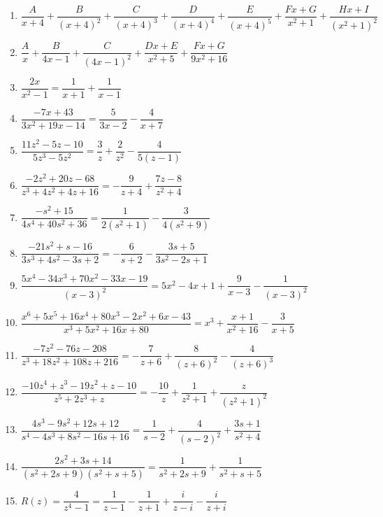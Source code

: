 \documentclass{ximera}
\begin{document}
\begin{enumerate}
\setcounter{enumi}{\value{HW}}

\item $\dfrac{A}{x + 4} + \dfrac{B}{(x + 4)^{2}} + \dfrac{C}{(x + 4)^{3}} + \dfrac{D}{(x + 4)^{4}} + \dfrac{E}{(x + 4)^{5}} + \dfrac{Fx + G}{x^{2} + 1} + \dfrac{Hx + I}{(x^{2} + 1)^{2}}$
\item $\dfrac{A}{x} + \dfrac{B}{4x - 1} + \dfrac{C}{(4x - 1)^{2}} + \dfrac{Dx + E}{x^{2} + 5} + \dfrac{Fx + G}{9x^{2} + 16}$


\item $\dfrac{2x}{x^{2} - 1} = \dfrac{1}{x + 1} + \dfrac{1}{x - 1}$
\item $\dfrac{-7x + 43}{3x^{2} + 19x - 14}= \dfrac{5}{3x - 2} - \dfrac{4}{x + 7}$


\item $\dfrac{11z^{2} - 5z - 10}{5z^{3} - 5z^{2}} = \dfrac{3}{z} + \dfrac{2}{z^{2}} - \dfrac{4}{5(z - 1)}$
\item $\dfrac{-2z^{2} + 20z - 68}{z^{3} + 4z^{2} + 4z + 16} = -\dfrac{9}{z + 4} + \dfrac{7z - 8}{z^{2} + 4}$


\item $\dfrac{-s^{2} + 15}{4s^{4} + 40s^{2} + 36} = \dfrac{1}{2(s^{2} + 1)} - \dfrac{3}{4(s^{2} + 9)}$
\item $\dfrac{-21s^{2} + s - 16}{3s^{3} + 4s^{2} - 3s + 2} = -\dfrac{6}{s + 2} - \dfrac{3s + 5}{3s^{2} - 2s + 1}$


\item $\dfrac{5x^{4} - 34x^{3} + 70x^{2} - 33x - 19}{(x - 3)^{2}} = 5x^{2} - 4x + 1 + \dfrac{9}{x - 3} - \dfrac{1}{(x - 3)^{2}}$
\item $\dfrac{x^{6} + 5x^{5} + 16x^{4} + 80x^{3} - 2x^{2} + 6x - 43}{x^{3} + 5x^{2} + 16x + 80} = x^{3} + \dfrac{x + 1}{x^{2} + 16} - \dfrac{3}{x + 5}$


\item $\dfrac{-7z^{2} - 76z - 208}{z^{3} + 18z^{2} + 108z + 216} = -\dfrac{7}{z + 6} + \dfrac{8}{(z + 6)^{2}} - \dfrac{4}{(z + 6)^{3}}$
\item $\dfrac{-10z^{4} + z^{3} - 19z^{2} + z - 10}{z^{5} + 2z^{3} + z} = -\dfrac{10}{z} + \dfrac{1}{z^{2} + 1} + \dfrac{z}{(z^{2} + 1)^{2}}$


\item $\dfrac{4s^{3} - 9s^{2} + 12s + 12}{s^{4} - 4s^{3} + 8s^{2} - 16s + 16}= \dfrac{1}{s - 2} + \dfrac{4}{(s - 2)^{2}} + \dfrac{3s + 1}{s^{2} + 4}$
\item $\dfrac{2s^{2} + 3s + 14}{(s^{2} + 2s + 9)(s^{2} + s + 5)} = \dfrac{1}{s^{2} + 2s + 9} + \dfrac{1}{s^{2} + s + 5}$

\item $R(z) = \dfrac{4}{z^4-1} = \dfrac{1}{z-1} - \dfrac{1}{z+1} + \dfrac{i}{z-i} -  \dfrac{i}{z+i} $

\end{enumerate}
\end{document}

